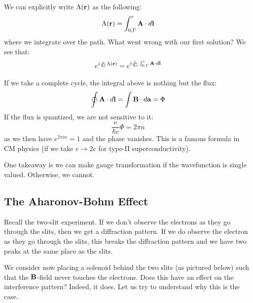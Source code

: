 We can explicitly write $\Lambda(\mathbf{r})$ as the following:
\begin{equation}
    \Lambda(\mathbf{r}) = \int_{0, \Gamma}^r \mathbf{A} \cdot d\mathbf{l}
\end{equation}
where we integrate over the path. What went wrong with our first solution? We see that:
\begin{equation}
    e^{i\frac{e}{\hbar c}\Lambda(\mathbf{r})} = e^{i\frac{e}{\hbar c}\int_{0, \Gamma}^r \mathbf{A} \cdot d\mathbf{l}}
\end{equation}

If we take a complete cycle, the integral above is nothing but the flux:
\begin{equation}
    \oint \mathbf{A} \cdot d\mathbf{l} = \int \mathbf{B} \cdot d\mathbf{a} = \Phi
\end{equation}
If the flux is quantized, we are not sensitive to it:
\begin{equation}
    \frac{e}{\hbar c}\Phi = 2\pi n
\end{equation}
as we then have $e^{2\pi i n} = 1$ and the phase vanishes. This is a famous formula in CM physics (if we take $e \to 2e$ for type-II superconductivity).

One takeaway is we can make gauge transformation if the wavefunction is single valued. Otherwise, we cannot.

\subsection{The Aharonov-Bohm Effect}
Recall the two-slit experiment. If we don't observe the electrons as they go through the slits, then we get a diffraction pattern. If we do observe the electron as they go through the slits, this breaks the diffraction pattern and we have two peaks at the same place as the slits.

We consider now placing a solenoid behind the two slits (as pictured below) such that the $\mathbf{B}$-field never touches the electrons. Does this have an effect on the interference pattern? Indeed, it does. Let us try to understand why this is the case. 

